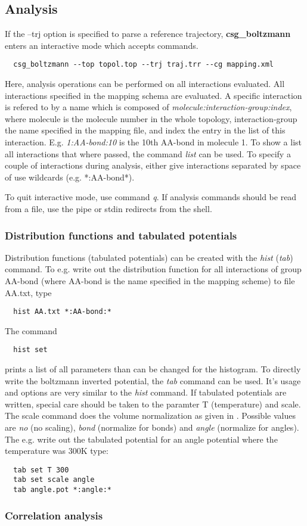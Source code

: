 \subsection{Analysis}
If the --trj option is specified to parse a reference trajectory, \textbf{csg\_boltzmann} enters an interactive mode which accepts commands.

\begin{verbatim}
  csg_boltzmann --top topol.top --trj traj.trr --cg mapping.xml 
\end{verbatim}

Here, analysis operations can be performed on all interactions evaluated. All interactions specified in the mapping schema are evaluated. A specific interaction is refered to by a name which is composed of \textit{molecule:interaction-group:index}, where molecule is the molecule number in the whole topology, interaction-group the name specified in the mapping file, and index the entry in the list of this interaction. E.g. \textit{1:AA-bond:10} is the 10th AA-bond in molecule 1. To show a list all interactions that where passed, the command \textit{list} can be used. To specify a couple of interactions during analysis, either give interactions separated by space of use wildcards (e.g. *:AA-bond*).

To quit interactive mode, use command \textit{q}. If analysis commands should be read from a file, use the pipe or stdin redirects from the shell.

\subsubsection{Distribution functions and tabulated potentials}
Distribution functions (tabulated potentials) can be created with the \textit{hist} (\textit{tab}) command.
To e.g. write out the distribution function for all interactions of group AA-bond (where AA-bond is the name specified in the mapping scheme) to file AA.txt, type
\begin{verbatim}
  hist AA.txt *:AA-bond:*   
\end{verbatim}
The command
\begin{verbatim}
  hist set
\end{verbatim}
prints a list of all parameters than can be changed for the histogram. To directly write the boltzmann inverted potential, the \textit{tab} command can be used. It's usage and options are very similar to the \textit{hist} command. If tabulated potentials are written, special care should be taken to the paramter T (temperature) and scale. The scale command does the volume normalization as given in     . Possible values are \textit{no} (no scaling), \textit{bond} (normalize for bonds) and \textit{angle} (normalize for angles). The e.g. write out the tabulated potential for an angle potential where the temperature was 300K type:
\begin{verbatim}
  tab set T 300
  tab set scale angle
  tab angle.pot *:angle:*
\end{verbatim}

\subsubsection{Correlation analysis}

